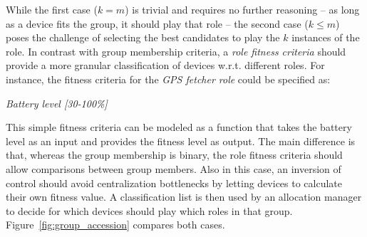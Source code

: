 While the first case ($k = m$) is trivial and requires no further reasoning -- as long as a device fits the group, it should play that role -- the second case ($k \le m$) poses the challenge of selecting the best candidates to play the $k$ instances of the role. In contrast with group membership criteria, a \textit{role fitness criteria} should provide a more granular classification of devices w.r.t. different roles. For instance, the fitness criteria for the \textit{GPS fetcher role} could be specified as:
\medskip

\begin{center}
	\small
	\textit{Battery level [30-100\%]}
\end{center}
\medskip
\normalsize

This simple fitness criteria can be modeled as a function that takes the battery level as an input and provides the fitness level as output. The main difference is that, whereas the group membership is binary, the role fitness criteria should allow comparisons between group members. Also in this case, an inversion of control should avoid centralization bottlenecks by letting devices to calculate their own fitness value. A classification list is then used by an allocation manager to decide for which devices should play which roles in that group. Figure~\ref{fig:group_accession} compares both cases.


